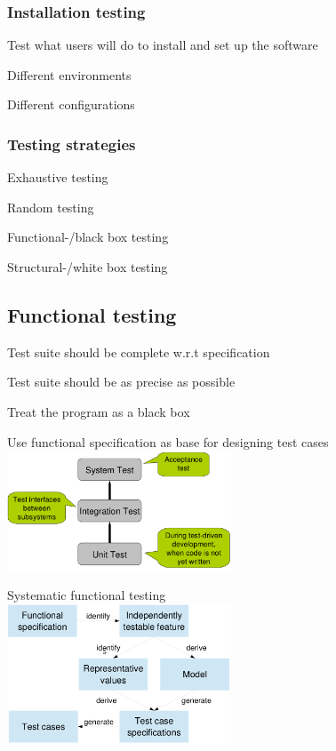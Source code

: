 \subsubsection{Installation testing}
\enumstart
	\item Test what users will do to install and set up the software
	\item Different environments
	\item Different configurations
\enumend

\subsubsection{Testing strategies}
\enumstart
	\item Exhaustive testing
	\item Random testing
	\item Functional-/black box testing
	\item Structural-/white box testing
\enumend

\subsection{Functional testing}
\enumstart
	\item Test suite should be complete w.r.t specification
	\item Test suite should be as precise as possible
	\item Treat the program as a black box
	\item Use functional specification as base for designing test cases
	\\ \includegraphics[width=0.5\textwidth]{img/functional_testing.png}
	\item Systematic functional testing
	\\ \includegraphics[width=0.5\textwidth]{img/systematic_functional_testing.png}
\enumend

